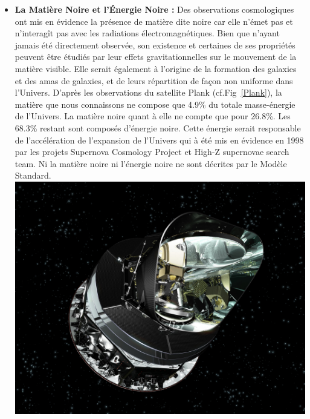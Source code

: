 \begin{itemize}[label=$\bullet$]
\item \textbf{La Matière Noire et l'Énergie Noire :} Des observations cosmologiques ont mis en évidence la présence de matière dite noire car elle n'émet pas et n'interagît pas avec les radiations électromagnétiques. Bien que n'ayant jamais été directement observée, son existence et certaines de ses propriétés peuvent être étudiés par leur effets gravitationnelles sur le mouvement de la matière visible. Elle serait  également à l'origine de la formation des galaxies et des amas de galaxies, et de leurs répartition de façon non uniforme dans l'Univers. D'après les observations du satellite Plank (cf.Fig~\ref{Plank}), la matière que nous connaissons ne compose que \num{4.9}\% du totale masse-énergie de l'Univers. La matière noire quant à elle ne compte que pour \num{26.8}\%. Les \num{68.3}\% restant sont composés d'énergie noire. Cette énergie serait responsable de l'accélération de l'expansion de l'Univers qui à été mis en évidence en \num{1998} par les projets Supernova Cosmology Project et High-Z supernovae search team. Ni la matière noire ni l'énergie noire ne sont décrites par le Modèle Standard.
\marginpar
{
\centering
\includegraphics[width=\marginparwidth]{SM/plank.jpg}
\label{Plank}
} 


\end{itemize}

